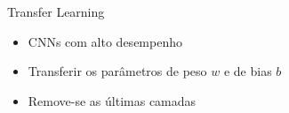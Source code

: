 \begin{frame}{Transfer Learning}
   \ \  \\[0.1cm]
   \begin{itemize}
     \item CNNs com alto desempenho
     \item Transferir os parâmetros de peso $w$ e de bias $b$
     \item Remove-se as últimas camadas
   \end{itemize}
\end{frame}
